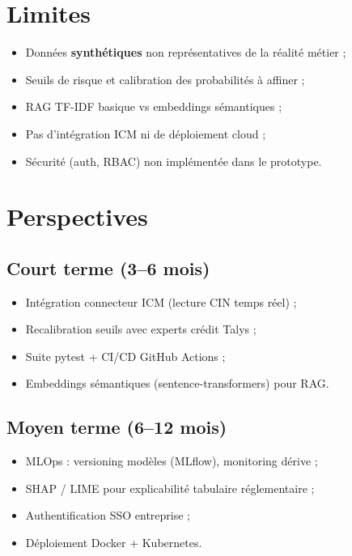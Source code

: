 \section{Limites}

\begin{itemize}[leftmargin=*]
  \item Données \textbf{synthétiques} non représentatives de la réalité métier ;
  \item Seuils de risque et calibration des probabilités à affiner ;
  \item RAG TF-IDF basique vs embeddings sémantiques ;
  \item Pas d'intégration ICM ni de déploiement cloud ;
  \item Sécurité (auth, RBAC) non implémentée dans le prototype.
\end{itemize}

\section{Perspectives}

\subsection{Court terme (3--6 mois)}

\begin{itemize}[leftmargin=*]
  \item Intégration connecteur ICM (lecture CIN temps réel) ;
  \item Recalibration seuils avec experts crédit Talys ;
  \item Suite pytest + CI/CD GitHub Actions ;
  \item Embeddings sémantiques (sentence-transformers) pour RAG.
\end{itemize}

\subsection{Moyen terme (6--12 mois)}

\begin{itemize}[leftmargin=*]
  \item MLOps : versioning modèles (MLflow), monitoring dérive ;
  \item SHAP / LIME pour explicabilité tabulaire réglementaire ;
  \item Authentification SSO entreprise ;
  \item Déploiement Docker + Kubernetes.
\end{itemize}

